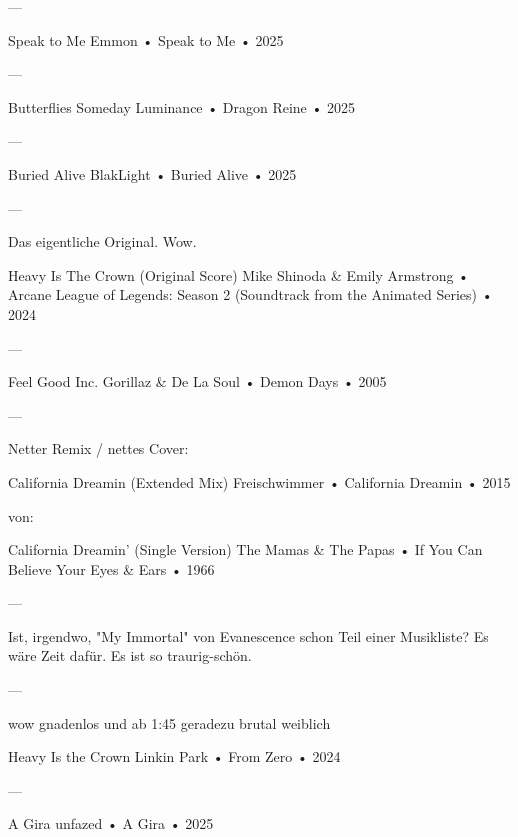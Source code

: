 —

Speak to Me
Emmon
 •
Speak to Me
 • 2025

—

Butterflies Someday
Luminance
 •
Dragon Reine
 • 2025

—

Buried Alive
BlakLight
 •
Buried Alive
 • 2025



—

Das eigentliche Original. Wow.

Heavy Is The Crown (Original Score)
Mike Shinoda
 &
Emily Armstrong
 •
Arcane League of Legends: Season 2 (Soundtrack from the Animated Series)
 •
2024

—


Feel Good Inc.
Gorillaz
 &
De La Soul
 •
Demon Days
 •
2005







































—

Netter Remix / nettes Cover:

California Dreamin (Extended Mix)
Freischwimmer
 •
California Dreamin
 •
2015

von:

California Dreamin' (Single Version)
The Mamas & The Papas
 •
If You Can Believe Your Eyes & Ears
 •
1966

—

Ist, irgendwo, "My Immortal" von Evanescence schon Teil einer Musikliste?
Es wäre Zeit dafür.
Es ist so traurig-schön.

—

wow
gnadenlos
und ab 1:45 geradezu brutal
weiblich

Heavy Is the Crown
Linkin Park
 •
From Zero
 •
2024

—

A Gira
unfazed
 •
A Gira
 •
2025


